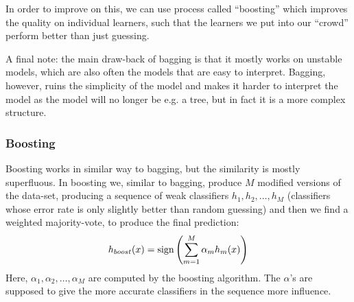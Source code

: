     In order to improve on this, we can use process called ``boosting'' which 
    improves the quality on individual learners, such that the learners we put 
    into our ``crowd'' perform better than just guessing.
    
    A final note: the main draw-back of bagging is that it mostly works on 
    unstable models, which are also often the models that are easy to 
    interpret. Bagging, however, ruins the simplicity of the model and makes it 
    harder to interpret the model as the model will no longer be e.g. a tree, 
    but in fact it is a more complex structure.
    
    
    \subsubsection{Boosting}
    Boosting works in similar way to bagging, but the similarity is mostly 
    superfluous. In boosting we, similar to bagging, produce $M$ modified 
    versions of the data-set, producing a sequence of weak classifiers 
    $h_1,h_2,\dots,h_M$ (classifiers whose error rate is only slightly better 
    than random guessing) and then we find a weighted majority-vote, to produce 
    the final prediction:
    \begin{equation*}
        h_{boost}(x)=\text{sign} \left(\sum_{m=1}^{M}\alpha_m h_m(x)\right)
    \end{equation*}
    Here, $\alpha_1,\alpha_2,\dots,\alpha_M$ are computed by the boosting 
    algorithm. The $\alpha$'s are supposed to give the more accurate 
    classifiers in the sequence more influence.
    
